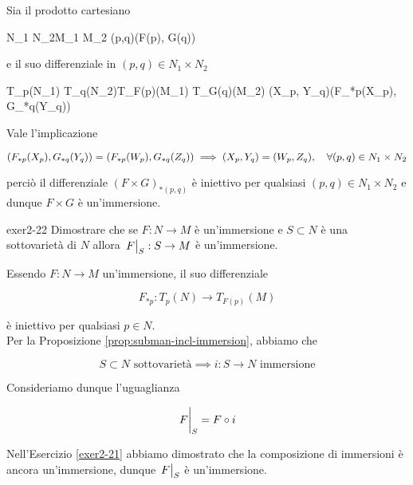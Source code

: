 {Sia il prodotto cartesiano

	{N_{1} \times N_{2}}{M_{1} \times M_{2}}
	{(p,q)}{(F(p), G(q))}

e il suo differenziale in $ (p,q) \in N_{1} \times N_{2} $

	{T_{p}(N_{1}) \times T_{q}(N_{2})}{T_{F(p)}(M_{1}) \times T_{G(q)}(M_{2})}
	{(X_{p}, Y_{q})}{(F_{*p}(X_{p}), G_{*q}(Y_{q}))}

Vale l'implicazione

\begin{equation}
	(F_{*p}(X_{p}), G_{*q}(Y_{q})) = (F_{*p}(W_{p}), G_{*q}(Z_{q})) %
	\implies %
	(X_{p}, Y_{q}) = (W_{p}, Z_{q}) %
	\qcomma \forall (p,q) \in N_{1} \times N_{2}
\end{equation}

perciò il differenziale $ (F \times G)_{*(p,q)} $ è iniettivo per qualsiasi $ (p,q) \in N_{1} \times N_{2} $ e dunque $ F \times G $ è un'immersione.
}


{exer2-22}
{
Dimostrare che se $ F : N \to M $ è un'immersione e $ S \subset N $ è una sottovarietà di $ N $ allora $ \eval{F}_{S} : S \to M $ è un'immersione.
}
{
Essendo $ F : N \to M $ un'immersione, il suo differenziale

\begin{equation}
	F_{*p} : T_{p}(N) \to T_{F(p)}(M)
\end{equation}

è iniettivo per qualsiasi $ p \in N $. \\
Per la Proposizione \ref{prop:subman-incl-immersion}, abbiamo che

\begin{equation}
	S \subset N \text{ sottovarietà} %
	\implies %
	i : S \to N \text{ immersione}
\end{equation}

Consideriamo dunque l'uguaglianza

\begin{equation}
	\eval{F}_{S} = F \circ i
\end{equation}

Nell'Esercizio \ref{exer2-21} abbiamo dimostrato che la composizione di immersioni è ancora un'immersione, dunque $ \eval{F}_{S} $ è un'immersione.
}


